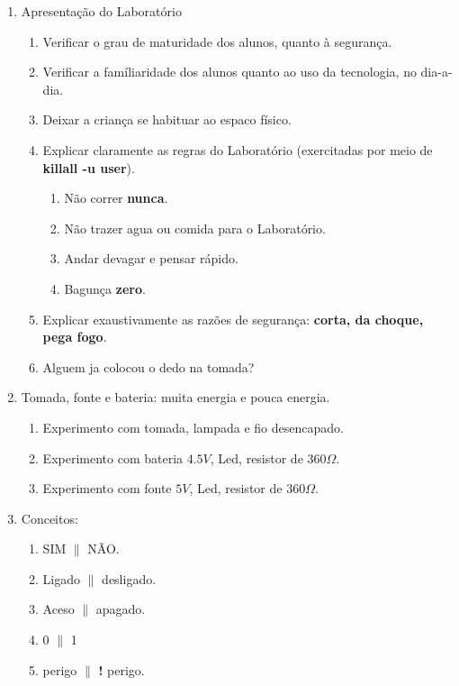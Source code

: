 \vfill\null
\pagebreak


\vfill\null
\pagebreak

\normalsize

\begin{enumerate}
	\item Apresentação do Laboratório
	\begin{enumerate}
		\item Verificar o grau de maturidade dos alunos, quanto à segurança.
		\item Verificar a famíliaridade dos alunos quanto ao uso da tecnologia, no dia-a-dia.
		\item Deixar a criança se habituar ao espaco físico.
		\item Explicar claramente as regras do Laboratório (exercitadas por meio de \textbf{killall -u user}).
		\begin{enumerate}
			\item Não correr \textbf{nunca}.
			\item Não trazer agua ou comida para o Laboratório.
			\item Andar devagar e pensar rápido.
			\item Bagunça \textbf{zero}.
		\end{enumerate}
	\item Explicar exaustivamente as razões de segurança: \textbf{corta, da choque, pega fogo}.
	\item Alguem ja colocou o dedo na tomada?
	\end{enumerate}
\item Tomada, fonte e bateria: muita energia e pouca energia.
\begin{enumerate}
	\item Experimento com tomada, lampada e fio desencapado.
	\item Experimento com bateria $4.5V$, Led, resistor de 360$\Omega$.
	\item Experimento com fonte $5V$, Led, resistor de 360$\Omega$.
\end{enumerate}
\item Conceitos:
\begin{enumerate}
	\item SIM $\|$ NÃO.
	\item Ligado $\|$ desligado.
	\item Aceso $\|$ apagado.
	\item 0 $\|$ 1
	\item perigo $\|$ \textbf{!} perigo.
\end{enumerate}
\end{enumerate}

